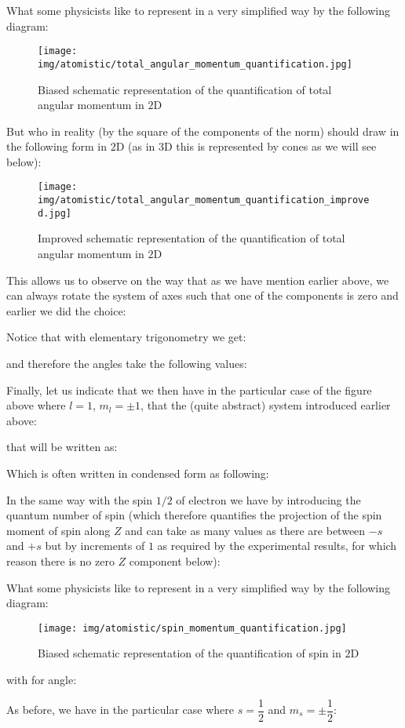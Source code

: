 	What some physicists like to represent in a very simplified way by the following diagram:
	\begin{figure}[H]
		\centering
		\texttt{[image: img/atomistic/total\_angular\_momentum\_quantification.jpg]}	
		\caption{Biased schematic representation of the quantification of total angular momentum in $2$D}
	\end{figure}
	But who in reality (by the square of the components of the norm) should draw in the following form in $2$D (as in $3$D this is represented by cones as we will see below):
	\begin{figure}[H]
		\centering
		\texttt{[image: img/atomistic/total\_angular\_momentum\_quantification\_improved.jpg]}	
		\caption{Improved schematic representation of the quantification of total angular momentum in $2$D}
	\end{figure}
	This allows us to observe on the way that as we have mention earlier above, we can always rotate the system of axes such that one of the components is zero and earlier we did the choice:
	
	Notice that with elementary trigonometry we get:
	
	and therefore the angles take the following values:
	
	Finally, let us indicate that we then have in the particular case of the figure above where $l=1$, $m_l=\pm 1$, that the (quite abstract) system introduced earlier above:
	
	that will be written as:
	
	Which is often written in condensed form as following:
	
	In the same way with the spin $1/2$ of electron we have by introducing the quantum number of spin (which therefore quantifies the projection of the spin moment of spin along $Z$ and can take as many values as there are between $-s$ and $+s$ but by increments of $1$ as required by the experimental results, for which reason there is no zero $Z$ component below):
	
	What some physicists like to represent in a very simplified way by the following diagram:
	\begin{figure}[H]
		\centering
		\texttt{[image: img/atomistic/spin\_momentum\_quantification.jpg]}	
		\caption{Biased schematic representation of the quantification of spin in $2$D}
	\end{figure}
	with for angle:
	
	As before, we have in the particular case where $s=\dfrac{1}{2}$ and $m_s=\pm\dfrac{1}{2}$:
	
